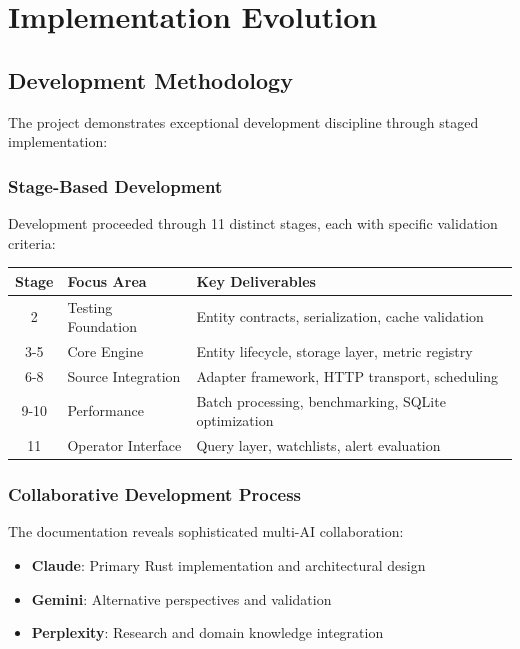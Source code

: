 \documentclass[12pt,a4paper]{article}
\begin{document}
\section{Implementation Evolution}

\subsection{Development Methodology}
The project demonstrates exceptional development discipline through staged implementation:

\subsubsection{Stage-Based Development}
Development proceeded through 11 distinct stages, each with specific validation criteria:

\begin{longtable}{|c|p{4cm}|p{9cm}|}
\hline
\textbf{Stage} & \textbf{Focus Area} & \textbf{Key Deliverables} \\
\hline
\endhead
2 & Testing Foundation & Entity contracts, serialization, cache validation \\
\hline
3-5 & Core Engine & Entity lifecycle, storage layer, metric registry \\
\hline
6-8 & Source Integration & Adapter framework, HTTP transport, scheduling \\
\hline
9-10 & Performance & Batch processing, benchmarking, SQLite optimization \\
\hline
11 & Operator Interface & Query layer, watchlists, alert evaluation \\
\hline
\end{longtable}

\subsubsection{Collaborative Development Process}
The documentation reveals sophisticated multi-AI collaboration:

\begin{itemize}
\item \textbf{Claude}: Primary Rust implementation and architectural design
\item \textbf{Gemini}: Alternative perspectives and validation
\item \textbf{Perplexity}: Research and domain knowledge integration
\end{itemize}
\end{document}
